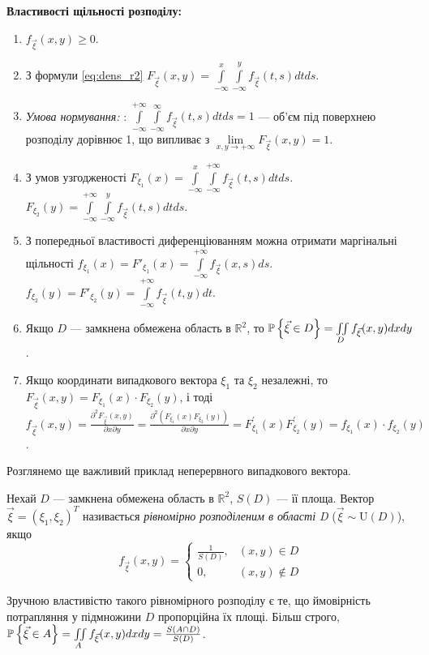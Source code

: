 \noindent\textbf{Властивості щільності розподілу:}
\begin{enumerate}
    \item $f_{\vec{\xi}}(x, y) \geq 0$.
    \item З формули \eqref{eq:dens_r2} $F_{\vec{\xi}}(x, y) 
    = \int\limits_{-\infty}^x \int\limits_{-\infty}^y f_{\vec{\xi}}(t, s) 
    dt ds $.
    \item \emph{Умова нормування:} : 
    $\int\limits_{-\infty}^{+\infty} \int\limits_{-\infty}^{\infty} f_{\vec{\xi}}(t, s) 
    dt ds = 1$ --- об'єм під поверхнею розподілу 
    дорівнює 1, що випливає з $\lim\limits_{x,y \to +\infty} F_{\vec{\xi}}(x, y) = 1$.
    \item З умов узгодженості $F_{\xi_1}(x) = \int\limits_{-\infty}^{x} \int\limits_{-\infty}^{+\infty} 
    f_{\vec{\xi}}(t, s) dt ds$.
    $F_{\xi_2}(y) = \int\limits_{-\infty}^{+\infty} \int\limits_{-\infty}^{y} 
    f_{\vec{\xi}}(t, s) dt ds$.
    \item З попередньої властивості диференціюванням можна отримати маргінальні щільності $f_{\xi_1}(x) = F'_{\xi_1}(x) 
    = \int\limits_{-\infty}^{+\infty} f_{\vec{\xi}}(x, s) ds $.
    $f_{\xi_2}(y) = F'_{\xi_2}(y) 
    = \int\limits_{-\infty}^{+\infty} f_{\vec{\xi}}(t, y) dt $.
    
    \item Якщо $D$ --- замкнена обмежена область в $\mathbb{R}^2$, то 
    $\P\left\{ \vec{\xi} \in D \right\} = \iint\limits_D f_{\vec{\xi}}(x, y) 
    dx dy$.
    \item Якщо координати випадкового вектора $\xi_1$ та $\xi_2$ незалежні, то
    $F_{\vec{\xi}}(x, y) = 
    F_{\xi_1}(x)\cdot F_{\xi_2}(y)$, і тоді
    $f_{\vec{\xi}}(x, y) = \frac{\partial^2 F_{\vec{\xi}}(x, y)}
    {\partial x \partial y} = \frac{\partial^2(F_{\xi_1}(x)F_{\xi_2}(y))}{\partial x \partial y} 
    = F_{\xi_1}^\prime (x)F_{\xi_2}^\prime (y) = 
    f_{\xi_1}(x)\cdot f_{\xi_2}(y)$.
\end{enumerate}
\vspace{1em}
Розглянемо ще важливий приклад неперервного випадкового вектора.
\begin{definition}
    Нехай $D$ --- замкнена обмежена область в $\mathbb{R}^2$,
    $S(D)$ --- її площа. 
    Вектор $\vec{\xi} = (\xi_1,\xi_2)^T$ називається 
    \emph{рівномірно розподіленим в області D} ($\vec{\xi} \sim \mathrm{U}(D)$), якщо 
    \begin{equation*}
        f_{\vec{\xi}}(x, y) = 
        \begin{cases}
            \frac{1}{S(D)},&(x, y) \in D \\
            0,&(x, y) \notin D
        \end{cases}
    \end{equation*}
\end{definition}
Зручною властивістю такого рівномірного розподілу є те, що
ймовірність потрапляння у підмножини $D$ пропорційна їх площі.
Більш строго, $\P\left\{\vec{\xi}\in A \right\} = \iint\limits_A f_{\vec{\xi}}(x, y) dx dy = 
\frac{S(A \cap D)}{S(D)}$.

